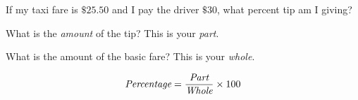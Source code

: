 \documentclass{ximera}
\begin{document}
\begin{question}
If my taxi fare is $\$25.50$ and I pay the driver $\$30$, what percent tip am I giving?

    \begin{multipleChoice}
    \end{multipleChoice}
    \begin{hint}
    What is the \emph{amount} of the tip? This is your \emph{part}.
    \end{hint}
    \begin{hint}
   What is the amount of the basic fare? This is your \emph{whole}.
    \end{hint}
  	\begin{hint}
    \[\emph{\text{Percentage}}=\frac{\emph{\text{Part}}}{\emph{\text{Whole}}}\times 100\]
    \end{hint}

\end{question}
\end{document}
